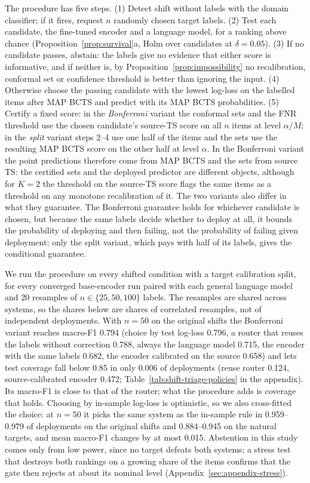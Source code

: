 The procedure has five steps. (1) Detect shift without labels with the domain classifier; if it fires, request $n$
randomly chosen target labels. (2) Test each candidate, the fine-tuned encoder and a language model, for a ranking
above chance (Proposition~\ref{prop:survival}a, Holm over candidates at $\delta = 0.05$). (3) If no candidate passes,
abstain: the labels give no evidence that either score is informative, and if neither is, by
Proposition~\ref{prop:impossibility} no recalibration, conformal set or confidence threshold is better than ignoring
the input. (4) Otherwise choose the passing candidate with the lowest log-loss on the labelled items after MAP BCTS and
predict with its MAP BCTS probabilities. (5) Certify a fixed score: in the \emph{Bonferroni} variant the conformal sets
and the FNR threshold use the chosen candidate's source-TS score on all $n$ items at level $\alpha/M$; in the
\emph{split} variant steps 2--4 use one half of the items and the sets use the resulting MAP BCTS score on the other
half at level $\alpha$. In the Bonferroni variant the point predictions therefore come from MAP BCTS and the sets from
source TS: the certified sets and the deployed predictor are different objects, although for $K = 2$ the threshold on
the source-TS score flags the same items as a threshold on any monotone recalibration of it. The two variants also
differ in what they guarantee. The Bonferroni guarantee holds for whichever candidate is chosen, but because the same
labels decide whether to deploy at all, it bounds the probability of deploying and then failing, not the probability
of failing given deployment; only the split variant, which pays with half of its labels, gives the conditional
guarantee.

We run the procedure on every shifted condition with a target calibration split, for every converged base-encoder run
paired with each general language model and 20 resamples of $n \in \{25, 50, 100\}$ labels. The resamples are shared
across systems, so the shares below are shares of correlated resamples, not of independent deployments. With $n = 50$
on the original shifts the Bonferroni variant reaches macro-F1 0.794 (choice by test log-loss 0.796, a router that reuses the
labels without correction 0.788, always the language model 0.715, the encoder with the same labels 0.682, the encoder
calibrated on the source 0.658) and lets test coverage fall below 0.85 in only 0.006 of deployments (reuse router
0.124, source-calibrated encoder 0.472; Table~\ref{tab:shift-triage-policies} in the appendix). Its macro-F1 is close to that of the router; what the
procedure adds is coverage that holds. Choosing by in-sample
log-loss is optimistic, so we also cross-fitted the choice: at $n = 50$ it picks the same system as the in-sample rule
in 0.959--0.979 of deployments on the original shifts and 0.884--0.945 on the natural targets, and mean macro-F1
changes by at most 0.015. Abstention in this study comes only from low power, since no target defeats both systems; a
stress test that destroys both rankings on a growing share of the items confirms that the gate then rejects at about
its nominal level (Appendix~\ref{sec:appendix-stress}).

